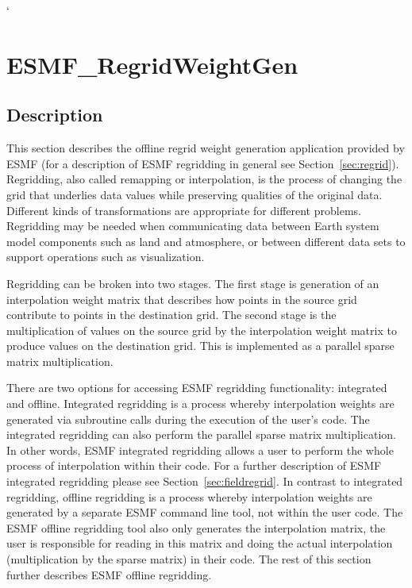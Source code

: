 `
\section{ESMF\_RegridWeightGen}
\label{sec:ESMF_RegridWeightGen}

\subsection{Description}

This section describes the offline regrid weight generation application provided by ESMF (for a description of ESMF regridding in general see Section~\ref{sec:regrid}). Regridding, also called remapping or interpolation, is the process of changing the grid that underlies data values while preserving qualities of the original data. Different kinds of transformations are appropriate for different problems. Regridding may be needed when communicating data between Earth system model components such as land and atmosphere, or between different data sets to support operations such as visualization. 

Regridding can be broken into two stages. The first stage is generation of an interpolation weight matrix that describes how points in
the source grid contribute to points in the destination grid. The second stage is the multiplication of values on the source grid by the
interpolation weight matrix to produce values on the destination grid. This is implemented as a parallel sparse matrix multiplication.

There are two options for accessing ESMF regridding functionality: integrated and offline. Integrated regridding is a process whereby interpolation
weights are generated via subroutine calls during the execution of the user's code. The integrated regridding can also perform the parallel sparse
matrix multiplication. In other words, ESMF integrated regridding allows a user to perform the whole process of interpolation within their code.
For a further description of ESMF integrated regridding please see Section~\ref{sec:fieldregrid}. 
In contrast to integrated regridding,
offline regridding is a process whereby interpolation weights are generated by a separate ESMF command line tool, not within the user code. The ESMF offline
regridding tool also only generates the interpolation matrix, the user is responsible for reading in this matrix and doing the actual interpolation
 (multiplication by the sparse matrix) in their code. The rest of this section further describes ESMF offline regridding.

